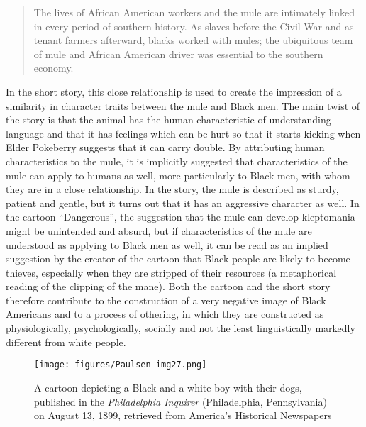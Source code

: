 \begin{quote}
The lives of African American workers and the mule are intimately linked in every period of southern history. As slaves before the Civil War and as tenant farmers afterward, blacks worked with mules; the ubiquitous team of mule and African American driver was essential to the southern economy.
\end{quote}


In the short story, this close relationship is used to create the impression of a similarity in character traits between the mule and Black men. The main twist of the story is that the animal has the human characteristic of understanding language and that it has feelings which can be hurt so that it starts kicking when Elder Pokeberry suggests that it can carry double. By attributing human characteristics to the mule, it is implicitly suggested that characteristics of the mule can apply to humans as well, more particularly to Black men, with whom they are in a close relationship. In the story, the mule is described as sturdy, patient and gentle, but it turns out that it has an aggressive character as well. In the cartoon “Dangerous”, the suggestion that the mule can develop kleptomania might be unintended and absurd, but if characteristics of the mule are understood as applying to Black men as well, it can be read as an implied suggestion by the creator of the cartoon that Black people are likely to become thieves, especially when they are stripped of their resources (a metaphorical reading of the clipping of the mane). Both the cartoon and the short story therefore contribute to the construction of a very negative image of Black Americans and to a process of othering, in which they are constructed as physiologically, psychologically, socially and not the least linguistically markedly different from white people.



\begin{figure}[b]
\texttt{[image: figures/Paulsen-img27.png]}
\caption{
A cartoon depicting a Black and a white boy with their dogs, published in the \emph{Philadelphia Inquirer} (Philadelphia, Pennsylvania) on August 13, 1899, retrieved from America's Historical Newspapers
}
\label{fig:key:27}
\end{figure}

